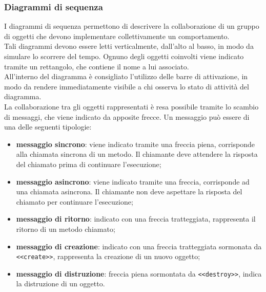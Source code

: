     	\subsubsection*{Diagrammi di sequenza}
    	I diagrammi di sequenza permettono di descrivere la collaborazione di un gruppo di oggetti che devono implementare collettivamente un comportamento. \\
    	Tali diagrammi devono essere letti verticalmente, dall'alto al basso, in modo da simulare lo scorrere del tempo. Ognuno degli oggetti coinvolti viene indicato tramite un rettangolo, che contiene il nome a lui associato. \\
    	All'interno del diagramma è consigliato l'utilizzo delle barre di attivazione, in modo da rendere immediatamente visibile a chi osserva lo stato di attività del diagramma. 	\\
    	La collaborazione tra gli oggetti rappresentati è resa possibile tramite lo scambio di messaggi, che viene indicato da apposite frecce. Un messaggio può essere di una delle seguenti tipologie:
    	\begin{itemize}
    		\item{\textbf{messaggio sincrono}}: viene indicato tramite una freccia piena, corrisponde alla chiamata sincrona di un metodo. Il chiamante deve attendere la risposta del chiamato prima di continuare l'esecuzione;
    		\item{\textbf{messaggio asincrono}}: viene indicato tramite una freccia, corrisponde ad una chiamata asincrona. Il chiamante non deve aspettare la risposta del chiamato per continuare l'esecuzione;
    		\item{\textbf{messaggio di ritorno}}: indicato con una freccia tratteggiata, rappresenta il ritorno di un metodo chiamato;
    		\item{\textbf{messaggio di creazione}}: indicato con una freccia tratteggiata sormonata da \texttt{<<create>>}, rappresenta la creazione di un nuovo oggetto;
    		\item{\textbf{messaggio di distruzione}}: freccia piena sormontata da \texttt{<<destroy>>}, indica la distruzione di un oggetto.
    	\end{itemize}

